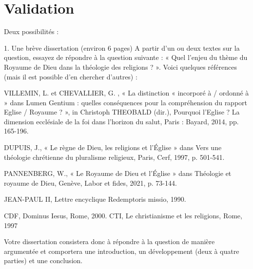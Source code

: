 \chapter{Validation}

Deux possibilités : 


1. Une brève dissertation (environ 6 pages) A partir d’un ou deux textes sur la question, essayez de répondre à la question suivante : « Quel l’enjeu du thème du Royaume de Dieu dans la théologie des religions ? ». Voici quelques références (mais il est possible d’en chercher d’autres) : 

VILLEMIN, L. et CHEVALLIER, G. , « La distinction « incorporé à / ordonné à » dans Lumen Gentium : quelles conséquences pour la compréhension du rapport Eglise / Royaume ? », in Christoph THEOBALD (dir.), Pourquoi l’Eglise ? La dimension ecclésiale de la foi dans l’horizon du salut, Paris : Bayard, 2014, pp. 165-196. 


DUPUIS, J., « Le règne de Dieu, les religions et l’Église » dans Vers une théologie chrétienne du pluralisme religieux, Paris, Cerf, 1997, p. 501-541. 

PANNENBERG, W., « Le Royaume de Dieu et l’Église » dans Théologie et royaume de Dieu, Genève, Labor et fides, 2021, p. 73-144. 

JEAN-PAUL II, Lettre encyclique Redemptoris missio, 1990. 

CDF, Dominus Iesus, Rome, 2000. CTI, Le christianisme et les religions, Rome, 1997 



Votre dissertation consistera donc à répondre à la question de manière argumentée et comportera une introduction, un développement (deux à quatre parties) et une conclusion.  


